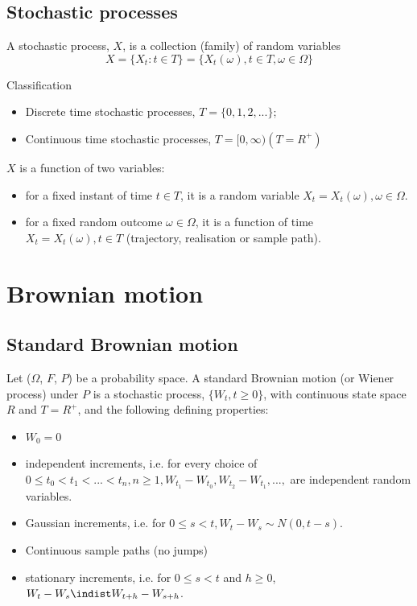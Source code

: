 \documentclass[11pt,a4paper]{book}
\theoremstyle{definition}\newtheorem{definition}{Definition}
\theoremstyle{definition}\newtheorem{fact}{Fact}
\theoremstyle{definition}\newtheorem{remark}{Remark}
\theoremstyle{definition}\newtheorem{ex}{Ex.}
\theoremstyle{definition}\newtheorem{project}{Project}
\theoremstyle{definition}\newtheorem{problem}{Problem}
\theoremstyle{definition}\newtheorem{example}{Example}
\numberwithin{theorem}{section}
\numberwithin{corollary}{chapter}
\numberwithin{assumption}{chapter}
\numberwithin{definition}{chapter}
\numberwithin{prop}{chapter}
\numberwithin{notation}{chapter}
\numberwithin{problem}{chapter}
\numberwithin{example}{chapter}
\numberwithin{fact}{chapter}
\numberwithin{ex}{chapter}
\begin{document}
\subsection{Stochastic processes}

A stochastic process, $X$, is a collection (family) of random variables
$$ X = \{X_t : t \in T \} = \{X_t(\omega), t \in T, \omega \in \Omega \} $$

Classification
\begin{itemize}
\item Discrete time stochastic processes, $T = \{0,1,2,...\}$;
\item Continuous time stochastic processes, $T = [0, \infty) (T = R^{+})$
\end{itemize}

$X$ is a function of two variables:
\begin{itemize}
\item for a fixed instant of time $t \in T$, it is a random variable $X_t = X_t(\omega), \omega \in \Omega$.
\item for a fixed random outcome $\omega \in \Omega$, it is a function of time $X_t = X_t(\omega), t \in T$ (trajectory, realisation or sample path).
\end{itemize}

\section{Brownian motion}

\subsection{Standard Brownian motion}
Let ($\Omega$, $F$, $P$) be a probability space. A standard Brownian motion (or Wiener process) under $P$ is a stochastic process, $\{W_t, t \geq 0 \}$, with continuous state space $R$ and $T = R^{+}$, and the following defining properties:
\begin{itemize}
\item $W_0 = 0$
\item independent increments, i.e. for every choice of $0 \leq t_0 < t_1 < ... < t_n, n \geq 1, W_{t_1} - W_{t_0}, W_{t_2} - W_{t_1}, ...,$ are independent random variables.
\item Gaussian increments, i.e. for $0 \leq s < t, W_t - W_s \sim N(0, t-s)$.
\item Continuous sample paths (no jumps)
\item stationary increments, i.e. for $0 \leq s < t$ and $h \geq 0$, $W_t - W_s \indist W_{t+h} - W_{s+h} $.
\end{itemize}
\end{document}
